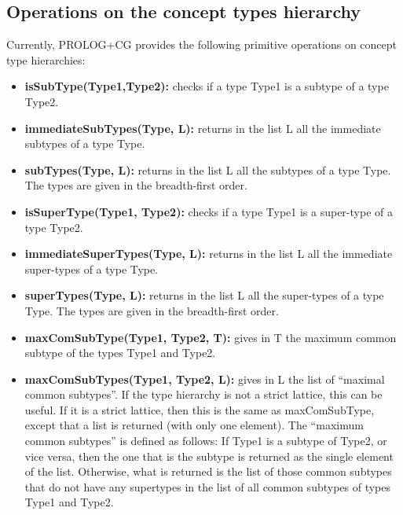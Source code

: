 \documentclass{book}
\begin{document}
\subsection{Operations on the concept types hierarchy} 

Currently, PROLOG+CG provides the following primitive operations on
concept type hierarchies:

\begin{itemize}

  \item {\bf isSubType(Type1,Type2):} checks if a type Type1
  is a subtype of a type Type2.

  \item {\bf immediateSubTypes(Type, L):} returns in the list L all
the immediate subtypes of a type Type.

  \item {\bf subTypes(Type, L):} returns in the list L all
  the subtypes of a type Type. The types are given in the
  breadth-first order.


  \item {\bf isSuperType(Type1, Type2):} checks if a type
  Type1 is a super-type of a type Type2.

  \item {\bf immediateSuperTypes(Type, L):} returns in the
  list L all the immediate super-types of a type Type.

  \item {\bf superTypes(Type, L):} returns in the list L all
  the super-types of a type Type. The types are given in the
  breadth-first order.

  \item {\bf maxComSubType(Type1, Type2, T):} gives in T the
  maximum common subtype of the types Type1 and Type2.

  \item {\bf maxComSubTypes(Type1, Type2, L):} gives in L the
  list of ``maximal common subtypes''.  If the type hierarchy is not a
  strict lattice, this can be useful.  If it is a strict lattice, then
  this is the same as maxComSubType, except that a list is returned
  (with only one element).  The ``maximum common subtypes'' is defined
  as follows: If Type1 is a subtype of Type2, or vice versa, then the
  one that is the subtype is returned as the single element of the
  list.  Otherwise, what is returned is the list of those common
  subtypes that do not have any supertypes in the list of all common
  subtypes of types Type1 and Type2.


\end{itemize}
\end{document}
